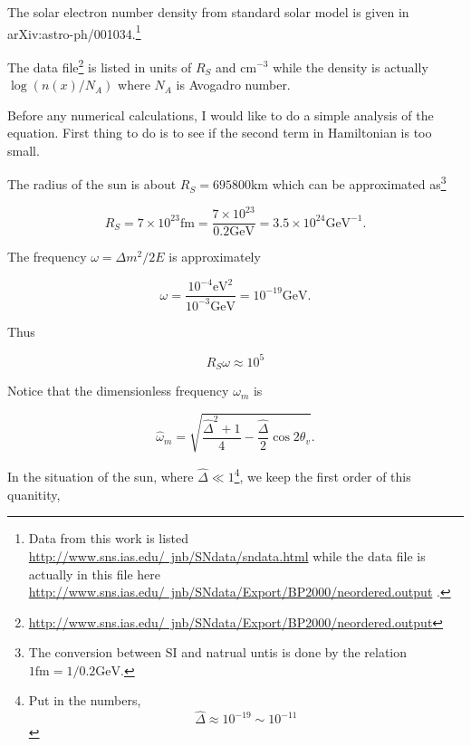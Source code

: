 \documentclass{tufte-handout}
\begin{document}
The solar electron number density from standard solar model is given in arXiv:astro-ph/001034.\footnote{Data from this work is listed \href{http://www.sns.ias.edu/~jnb/SNdata/sndata.html}{http://www.sns.ias.edu/~jnb/SNdata/sndata.html} while the data file is actually in this file here \href{http://www.sns.ias.edu/~jnb/SNdata/Export/BP2000/neordered.output}{http://www.sns.ias.edu/~jnb/SNdata/Export/BP2000/neordered.output} .}

The data file\footnote{\href{http://www.sns.ias.edu/~jnb/SNdata/Export/BP2000/neordered.output}{http://www.sns.ias.edu/~jnb/SNdata/Export/BP2000/neordered.output} } is listed in units of $R_S$ and $\mathrm{cm}^{-3}$ while the density is actually $\log(n(x)/N_A)$ where $N_A$ is Avogadro number.

Before any numerical calculations, I would like to do a simple analysis of the equation. First thing to do is to see if the second term in Hamiltonian is too small.

The radius of the sun is about $R_S = 695800\mathrm{km}$ which can be approximated as\footnote{The conversion between SI and natrual untis is done by the relation $1\mathrm{fm}=1/0.2\mathrm{GeV}$.}

\begin{equation*}
R_S = 7\times 10^{23}\mathrm{fm}= \frac{7\times 10^{23} }{0.2 \mathrm{GeV} } = 3.5 \times 10^{24} \mathrm{GeV^{-1}} .
\end{equation*}

The frequency $\omega = \Delta m^2/2E$ is approximately

\begin{equation*}
\omega = \frac{10^{-4} \mathrm{eV^2}}{10^{-3}\mathrm{GeV}} = 10^{-19} \mathrm{GeV}.
\end{equation*}

Thus 

\begin{equation*}
R_S \omega \approx  10^5
\end{equation*}


Notice that the dimensionless frequency $\omega_m$ is

\begin{equation*}
\hat \omega_m  = \sqrt{\frac{\hat\Delta ^2 + 1}{4} - \frac{\hat\Delta}{2}\cos 2\theta_v }.
\end{equation*}

In the situation of the sun, where $\hat\Delta \ll 1$\footnote{
Put in the numbers,
\begin{equation*}
\hat\Delta \approx 10^{-19} \sim 10^{-11}
\end{equation*}
}, we keep the first order of this quanitity,
\end{document}
